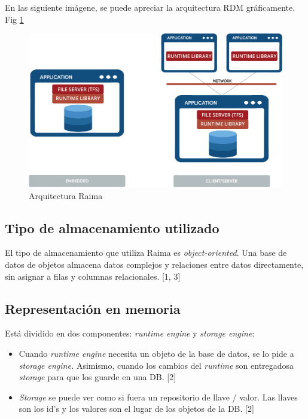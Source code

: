 \documentclass{acmart}
\begin{document}
En las siguiente imágene, se puede apreciar la arquitectura RDM gráficamente. Fig \ref{arqRaima}

\begin{figure}
	\includegraphics[width=\linewidth]{arq_1.png} %
	\caption{Arquitectura Raima} %
	\label{arqRaima} %
\end{figure}


\subsection{Tipo de almacenamiento utilizado}
El tipo de almacenamiento que utiliza Raima es \textit{object-oriented}. Una base de datos de objetos almacena datos complejos y relaciones entre datos directamente, sin asignar a filas y columnas relacionales. [1, 3]

\subsection{Representación en memoria}
Está dividido en dos componentes: \textit{runtime engine} y \textit{storage engine}:
\begin{itemize}
	\item Cuando \textit{runtime engine }necesita un objeto de la base de datos, se lo pide a \textit{storage engine. }Asimismo, cuando los cambios del \textit{runtime }son entregadosa \textit{storage }para que los guarde en una DB. [2]

	\item \textit{Storage }se puede ver como si fuera un repositorio de llave / valor. Las llaves son los id’s y los valores son el lugar de los objetos de la DB. [2]
\end{itemize}
\end{document}
